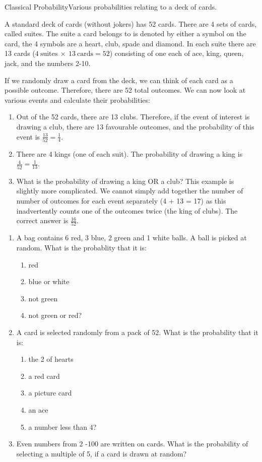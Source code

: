 \documentclass[10pt,a4paper,titlepage,twoside,openright]{report}
\begin{document}
\begin{wex}{Classical Probability}{Various probabilities relating to a deck of cards.}{
A standard deck of cards (without jokers) has 52 cards. There are 4 sets of cards, called suites. The suite a card belongs to is denoted by either a symbol on the card, the 4 symbols are a heart, club, spade and diamond. In each suite there are 13 cards ($4\ \mbox{suites}\ \times\ 13\ \mbox{cards}=52$) consisting of one each of ace, king, queen, jack, and the numbers 2-10.  

If we randomly draw a card from the deck, we can think of each card as a possible outcome. Therefore, there are 52 total outcomes. We can now look at various events and calculate their probabilities:

\begin{enumerate}
\item Out of the 52 cards, there are 13 clubs. Therefore, if the event of interest is drawing a club, there are 13 favourable outcomes, and the probability of this event is $\frac{13}{52} = \frac{1}{4}$.
\item There are 4 kings (one of each suit). The probability of drawing a king is $\frac{4}{52} = \frac{1}{13}$.
\item What is the probability of drawing a king OR a club? This example is slightly more complicated. We cannot simply add together the number of number of outcomes for each event separately (4 + 13 = 17) as this inadvertently counts one of the outcomes twice (the king of clubs). The correct answer is $\frac{16}{52}$.
\end{enumerate}}
\end{wex}

{
\begin{enumerate}
\item A bag contains 6 red, 3 blue, 2 green and 1 white balls. A ball is picked at random. What is the probablity that it is: 
	\begin{enumerate}
	\item red
	\item blue or white
	\item not green  
	\item not green or red? 
	\end{enumerate}
\item A card is selected randomly from a pack of 52. What is the probability that it is:
	\begin{enumerate} 
	\item the 2 of hearts  
	\item a red card  
	\item a picture card  
	\item an ace   
	\item a number less than 4? 
	\end{enumerate}
\item  Even numbers from 2 -100 are written on cards. What is the probability of selecting a multiple of 5, if a card is drawn at random?
\end{enumerate}
}
\end{document}
